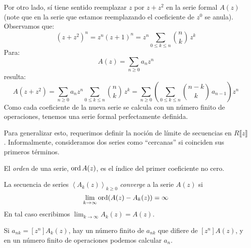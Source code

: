   Por otro lado,
  sí tiene sentido reemplazar \(z\)
  por \(z + z^2\) en la serie formal \(A(z)\)
  (note que en la serie que estamos reemplazando
   el coeficiente de \(z^0\) se anula).
  Observamos que:
  \begin{equation*}
    (z + z^2)^n
      = z^n (z + 1)^n
      = z^n \sum_{0 \le k \le n} \binom{n}{k} \, z^k
  \end{equation*}
  Para:
  \begin{equation*}
    A(z)
      = \sum_{n \ge 0} a_n z^n
  \end{equation*}
  resulta:
  \begin{equation*}
    A(z + z^2)
      = \sum_{n \ge 0} a_n z^n \sum_{0 \le k \le n} \binom{n}{k} \, z^k
      = \sum_{n \ge 0}
	  \left(
	    \sum_{0 \le k \le n} \binom{n - k}{k} \, a_{n - 1}
	  \right) z^n
  \end{equation*}
  Como cada coeficiente de la nueva serie
  se calcula con un número finito de operaciones,
  tenemos una serie formal perfectamente definida.

  Para generalizar esto,
  requerimos definir
  la noción de límite de secuencias en \(R \llbracket z \rrbracket\).
  Informalmente,
  consideramos dos series como ``cercanas'' si coinciden sus primeros términos.
  \begin{definition}
    El \emph{orden} de una serie,%
    \(\operatorname{ord} A(z)\),
    es el índice del primer coeficiente no cero.
  \end{definition}
  \begin{definition}
    La secuencia de series
    \(\left\langle A_k(z) \right\rangle_{k \ge 0}\)
    \emph{converge} a la serie \(A(z)\) si%
    \begin{equation*}
      \lim_{k \rightarrow \infty} \operatorname{ord} (A(z) - A_k(z))
	= \infty
    \end{equation*}
    En tal caso
    escribimos \(\lim_{k \rightarrow \infty} A_k(z) =  A(z)\).
  \end{definition}
  Si \(a_{n k} = \left[ z^n \right] A_k(z)\),
  hay un número finito de \(a_{n k}\)
  que difiere de \(\left[ z^n \right] A(z)\),
  y en un número finito de operaciones podemos calcular \(a_n\).

